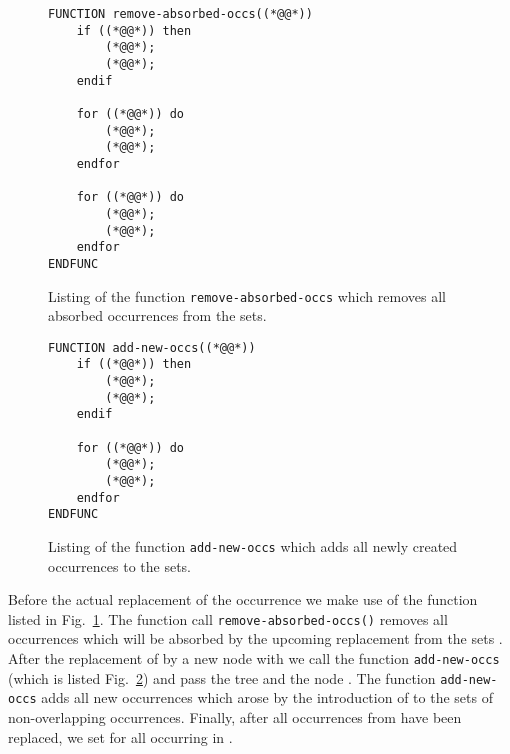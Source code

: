 \documentclass[12pt]{llncs}
\begin{document}
\begin{figure}[tb]
	\begin{lstlisting}
FUNCTION remove-absorbed-occs((*@@*))
	if ((*@@*)) then
		(*@@*);
		(*@@*);
	endif
	
	for ((*@@*)) do
		(*@@*);
		(*@@*);
	endfor
	
	for ((*@@*)) do
		(*@@*);
		(*@@*);
	endfor
ENDFUNC	
	\end{lstlisting}
	\caption{Listing of the function \texttt{remove-absorbed-occs} which removes all absorbed occurrences from the  sets.}\label{lst:remove-absorbed-occs}
\end{figure}
\begin{figure}[tb]
	\begin{lstlisting}
FUNCTION add-new-occs((*@@*))
	if ((*@@*)) then
		(*@@*);
		(*@@*);
	endif
	
	for ((*@@*)) do
		(*@@*);
		(*@@*);
	endfor
ENDFUNC	
	\end{lstlisting}
	\caption{Listing of the function \texttt{add-new-occs} which adds all newly created occurrences to the  sets.}\label{lst:add-new-occs}
\end{figure}
Before the actual replacement of the occurrence  we make use of the function listed in Fig.~\ref{lst:remove-absorbed-occs}. The function call \texttt{remove-absorbed-occs(}\texttt{)} removes all occurrences which will be absorbed by the upcoming replacement from the sets . After the replacement of  by a new node  with  we call the function \verb|add-new-occs| (which is listed Fig.~\ref{lst:add-new-occs}) and pass the tree  and the node . The function \verb|add-new-occs| adds all new occurrences which arose by the introduction of  to the sets of non-overlapping occurrences. Finally, after all occurrences from  have been replaced, we set  for all  occurring in .
\end{document}
